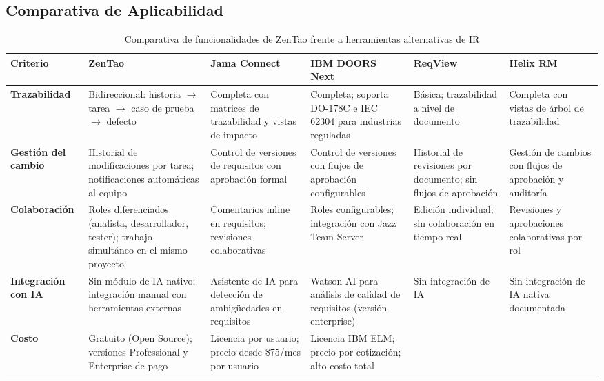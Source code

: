 \documentclass[journal,onecolumn]{IEEEtran}
\begin{document}
\subsection{Comparativa de Aplicabilidad}

\begin{table}[H]
	\caption{Comparativa de funcionalidades de ZenTao frente a herramientas alternativas de IR}
	\label{tab:comparativa}
	\renewcommand{\arraystretch}{1.3}
	\begin{tabularx}{\textwidth}{|l|X|X|X|X|X|}
		\hline
		\textbf{Criterio} & \textbf{ZenTao} & \textbf{Jama Connect} & \textbf{IBM DOORS Next} & \textbf{ReqView} & \textbf{Helix RM} \\
		\hline
		\textbf{Trazabilidad} \cite{hussain2022}
		& Bidireccional: historia $\rightarrow$ tarea $\rightarrow$ caso de prueba $\rightarrow$ defecto
		& Completa con matrices de trazabilidad y vistas de impacto
		& Completa; soporta DO-178C e IEC 62304 para industrias reguladas
		& Básica; trazabilidad a nivel de documento
		& Completa con vistas de árbol de trazabilidad \\
		\hline
		\textbf{Gestión del cambio} \cite{wiegers2013}
		& Historial de modificaciones por tarea; notificaciones automáticas al equipo
		& Control de versiones de requisitos con aprobación formal
		& Control de versiones con flujos de aprobación configurables
		& Historial de revisiones por documento; sin flujos de aprobación
		& Gestión de cambios con flujos de aprobación y auditoría \\
		\hline
		\textbf{Colaboración} \cite{zentao2025}
		& Roles diferenciados (analista, desarrollador, tester); trabajo simultáneo en el mismo proyecto
		& Comentarios inline en requisitos; revisiones colaborativas
		& Roles configurables; integración con Jazz Team Server
		& Edición individual; sin colaboración en tiempo real
		& Revisiones y aprobaciones colaborativas por rol \\
		\hline
		\textbf{Integración con IA} \cite{siddique2023}
		& Sin módulo de IA nativo; integración manual con herramientas externas
		& Asistente de IA para detección de ambigüedades en requisitos
		& Watson AI para análisis de calidad de requisitos (versión enterprise)
		& Sin integración de IA
		& Sin integración de IA nativa documentada \\
		\hline
		\textbf{Costo} \cite{wiegers2013}
		& Gratuito (Open Source); versiones Professional y Enterprise de pago
		& Licencia por usuario; precio desde \$75/mes por usuario
		& Licencia IBM ELM; precio por cotización; alto costo total

\end{tabularx}
\end{table}
\end{document}
